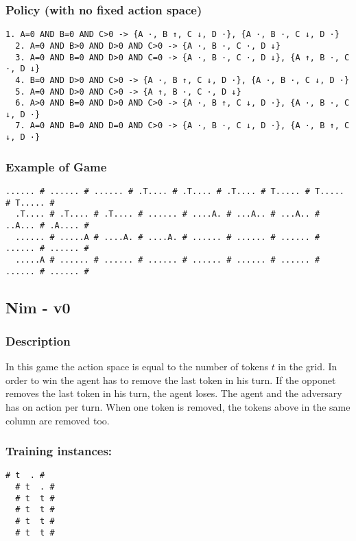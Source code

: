 \documentclass[a4paper]{article}
\begin{document}
\subsubsection{Policy (with no fixed action space)}
\begin{Verbatim}[fontsize=\footnotesize]
  1. A=0 AND B=0 AND C>0 -> {A ·, B ↑, C ↓, D ·}, {A ·, B ·, C ↓, D ·}
  2. A=0 AND B>0 AND D>0 AND C>0 -> {A ·, B ·, C ·, D ↓}
  3. A=0 AND B=0 AND D>0 AND C=0 -> {A ·, B ·, C ·, D ↓}, {A ↑, B ·, C ·, D ↓}
  4. B=0 AND D>0 AND C>0 -> {A ·, B ↑, C ↓, D ·}, {A ·, B ·, C ↓, D ·}
  5. A=0 AND D>0 AND C>0 -> {A ↑, B ·, C ·, D ↓}
  6. A>0 AND B=0 AND D>0 AND C>0 -> {A ·, B ↑, C ↓, D ·}, {A ·, B ·, C ↓, D ·}
  7. A=0 AND B=0 AND D=0 AND C>0 -> {A ·, B ·, C ↓, D ·}, {A ·, B ↑, C ↓, D ·}

\end{Verbatim}

\subsubsection{Example of Game}
\begin{Verbatim}[fontsize=\footnotesize]
  ...... # ...... # ...... # .T.... # .T.... # .T.... # T..... # T..... # T..... #
  .T.... # .T.... # .T.... # ...... # ....A. # ...A.. # ...A.. # ..A... # .A.... #
  ...... # .....A # ....A. # ....A. # ...... # ...... # ...... # ...... # ...... #
  .....A # ...... # ...... # ...... # ...... # ...... # ...... # ...... # ...... #
\end{Verbatim}

\subsection{Nim - v0}
\subsubsection{Description}
In this game the action space is equal to the number of tokens $t$ in the grid. In order to win the agent has to remove the last token in his turn. If the opponet removes the last token in his turn, the agent loses. The agent and the adversary has on action per turn. When one token is removed, the tokens above in the same column are removed too.

\subsubsection{Training instances:}
\begin{Verbatim}[fontsize=\footnotesize]
  # t  . #
  # t  . #
  # t  t #
  # t  t #
  # t  t #
  # t  t #
\end{Verbatim}
\end{document}
